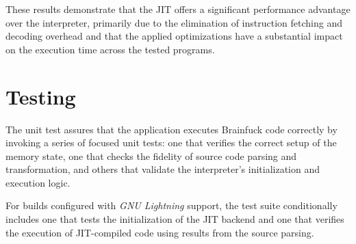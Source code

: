 \par These results demonstrate that the JIT offers a significant performance advantage over the interpreter, primarily due to the elimination of instruction fetching and decoding overhead and that the applied optimizations have a substantial impact on the execution time across the tested programs.

\section{Testing}
\label{sec:ch2sec4}

\par The unit test assures that the application executes Brainfuck code correctly by invoking a series of focused unit tests: one that verifies the correct setup of the memory state, one that checks the fidelity of source code parsing and transformation, and others that validate the interpreter's initialization and execution logic.

\par For builds configured with \textit{GNU Lightning} support, the test suite conditionally includes one that tests the initialization of the JIT backend and one that verifies the execution of JIT-compiled code using results from the source parsing.